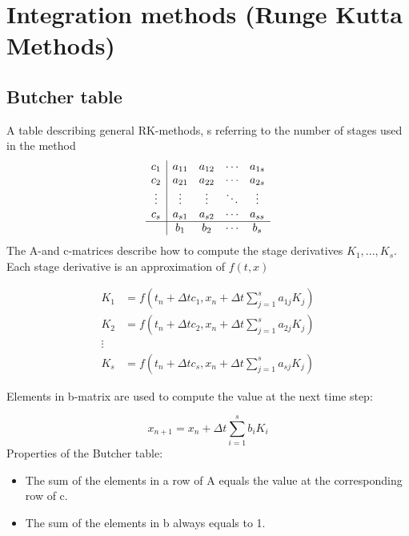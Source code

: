 \section{Integration methods (Runge Kutta Methods)}
\subsection{Butcher table}
A table describing general RK-methods, s referring to the number of stages used in the method
$$
\begin{array}{c|cccc}
c_1 & a_{11} & a_{12} & \cdots & a_{1s} \\
c_2 & a_{21} & a_{22} & \cdots & a_{2s} \\
\vdots & \vdots & \vdots & \ddots & \vdots \\
c_s & a_{s1} & a_{s2} & \cdots & a_{ss} \\
\hline
& b_1 & b_2 & \cdots & b_s \\
\end{array}
$$
The A-and c-matrices describe how to compute the stage derivatives $K_1,...,K_s$. Each stage derivative is an approximation of $f(t,x)$

\begin{equation*}
    \begin{split}
        K_1 &= f(t_n + \Delta tc_1, x_n + \Delta t \sum_{j=1}^{s} a_{1j} K_j) \\
        K_2 &= f(t_n + \Delta tc_2, x_n + \Delta t \sum_{j=1}^{s} a_{2j} K_j) \\
        \vdots \\
        K_s &= f(t_n + \Delta tc_s, x_n + \Delta t \sum_{j=1}^{s} a_{sj} K_j)
    \end{split}
\end{equation*}

Elements in b-matrix are used to compute the value at the next time step:

\begin{equation*}
    x_{n+1} = x_n + \Delta t\sum_{i=1}^{s}b_iK_i
\end{equation*}
Properties of the Butcher table:
\begin{itemize}
    \item The sum of the elements in a row of A equals the value at the corresponding row of c.
    \item The sum of the elements in b always equals to 1.
\end{itemize}

